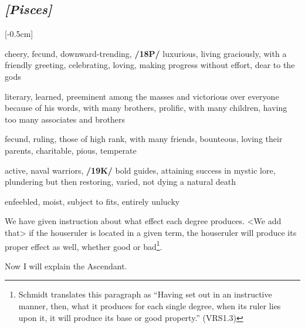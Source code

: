 \subsection{\textit{[Pisces]}}
\marginnote{\Pisces}[-0.5cm]
\vspace{-1mm}
\begin{description}[labelindent=0em , labelwidth=1em, labelsep=1em, leftmargin =!]
\item[\Venus]
	[0-11] cheery, fecund, downward-trending, \textbf{/18P/} luxurious, living graciously, with a friendly greeting, celebrating, loving, making progress without effort, dear to the gods
\item[\Jupiter]
	[12-15] literary, learned, preeminent among the masses and victorious over everyone because of his words, with many brothers, prolific, with many children, having too many associates and brothers	
\item[\Mercury]
	[16-18] fecund, ruling, those of high rank, with many friends, bounteous, loving their parents, charitable, pious, temperate	
\item[\Mars]
	[19-27] active, naval warriors, \textbf{/19K/} bold guides, attaining success in mystic lore, plundering but then restoring, varied, not dying a natural death	
\item[\Saturn]
	[28-29] enfeebled, moist, subject to fits, entirely unlucky	
\end{description}

\mndl[0.2cm]
We have given instruction about what effect each degree produces. <We add that> if the houseruler is located in a given term, the houseruler will produce its proper effect as well, whether good or bad\footnote{Schmidt translates this paragraph as ``Having set out in an instructive manner, then, what it produces for each single degree, when its ruler lies upon it, it will produce its base or good property.'' (VRS1.3)}.

 Now I will explain the Ascendant.
\newpage
